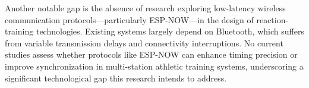 	Another notable gap is the absence of research exploring low-latency wireless communication protocols—particularly ESP-NOW—in the design of reaction-training technologies. Existing systems largely depend on Bluetooth, which suffers from variable transmission delays and connectivity interruptions. No current studies assess whether protocols like ESP-NOW can enhance timing precision or improve synchronization in multi-station athletic training systems, underscoring a significant technological gap this research intends to address.
	













